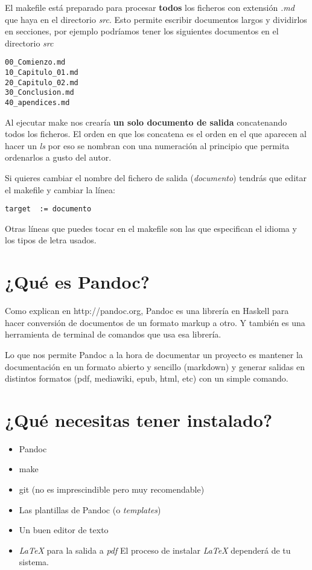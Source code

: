 \documentclass[
  12pt,
  spanish,
]{article}
\providecommand{\tightlist}{%
  \setlength{\itemsep}{0pt}\setlength{\parskip}{0pt}}
\begin{document}
El makefile está preparado para procesar \textbf{todos} los ficheros con
extensión \emph{.md} que haya en el directorio \emph{src}. Esto permite
escribir documentos largos y dividirlos en secciones, por ejemplo
podríamos tener los siguientes documentos en el directorio \emph{src}

\begin{verbatim}
00_Comienzo.md
10_Capitulo_01.md
20_Capitulo_02.md
30_Conclusion.md
40_apendices.md
\end{verbatim}

Al ejecutar make nos crearía \textbf{un solo documento de salida}
concatenando todos los ficheros. El orden en que los concatena es el
orden en el que aparecen al hacer un \emph{ls} por eso se nombran con
una numeración al principio que permita ordenarlos a gusto del autor.

Si quieres cambiar el nombre del fichero de salida (\emph{documento})
tendrás que editar el makefile y cambiar la línea:

\begin{verbatim}
target  := documento
\end{verbatim}

Otras líneas que puedes tocar en el makefile son las que especifican el
idioma y los tipos de letra usados.

\hypertarget{quuxe9-es-pandoc}{%
\section{¿Qué es Pandoc?}\label{quuxe9-es-pandoc}}

Como explican en http://pandoc.org, Pandoc es una librería en Haskell
para hacer conversión de documentos de un formato markup a otro. Y
también es una herramienta de terminal de comandos que usa esa librería.

Lo que nos permite Pandoc a la hora de documentar un proyecto es
mantener la documentación en un formato abierto y sencillo (markdown) y
generar salidas en distintos formatos (pdf, mediawiki, epub, html, etc)
con un simple comando.

\hypertarget{quuxe9-necesitas-tener-instalado}{%
\section{¿Qué necesitas tener
instalado?}\label{quuxe9-necesitas-tener-instalado}}

\begin{itemize}
\tightlist
\item
  Pandoc
\item
  make
\item
  git (no es imprescindible pero muy recomendable)
\item
  Las plantillas de Pandoc (o \emph{templates})
\item
  Un buen editor de texto
\item
  \emph{LaTeX} para la salida a \emph{pdf} El proceso de instalar
  \emph{LaTeX} dependerá de tu sistema.
\end{itemize}
\end{document}
